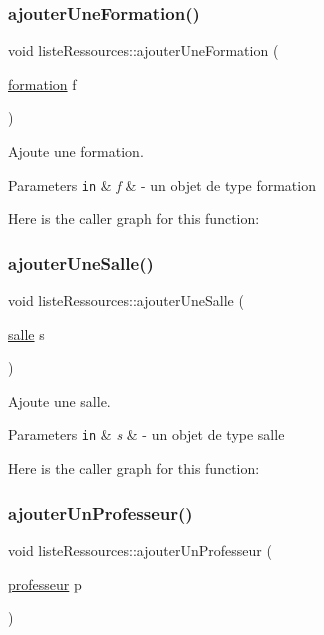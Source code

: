 \subsubsection{\texorpdfstring{ajouter\+Une\+Formation()}{ajouterUneFormation()}}
{\footnotesize\ttfamily void liste\+Ressources\+::ajouter\+Une\+Formation (\begin{DoxyParamCaption}\item[{\hyperlink{classformation}{formation}}]{f }\end{DoxyParamCaption})}



Ajoute une formation. 


\begin{DoxyParams}[1]{Parameters}
\mbox{\tt in}  & {\em f} & -\/ un objet de type formation \\
\hline
\end{DoxyParams}
Here is the caller graph for this function\+:
\hypertarget{classliste_ressources_ae5c412bcd7a536081d98181e836d578b}{}\label{classliste_ressources_ae5c412bcd7a536081d98181e836d578b} 
\subsubsection{\texorpdfstring{ajouter\+Une\+Salle()}{ajouterUneSalle()}}
{\footnotesize\ttfamily void liste\+Ressources\+::ajouter\+Une\+Salle (\begin{DoxyParamCaption}\item[{\hyperlink{classsalle}{salle}}]{s }\end{DoxyParamCaption})}



Ajoute une salle. 


\begin{DoxyParams}[1]{Parameters}
\mbox{\tt in}  & {\em s} & -\/ un objet de type salle \\
\hline
\end{DoxyParams}
Here is the caller graph for this function\+:
\hypertarget{classliste_ressources_afb8d1bb96971684ed945622b462fcd5d}{}\label{classliste_ressources_afb8d1bb96971684ed945622b462fcd5d} 
\subsubsection{\texorpdfstring{ajouter\+Un\+Professeur()}{ajouterUnProfesseur()}}
{\footnotesize\ttfamily void liste\+Ressources\+::ajouter\+Un\+Professeur (\begin{DoxyParamCaption}\item[{\hyperlink{classprofesseur}{professeur}}]{p }\end{DoxyParamCaption})}



